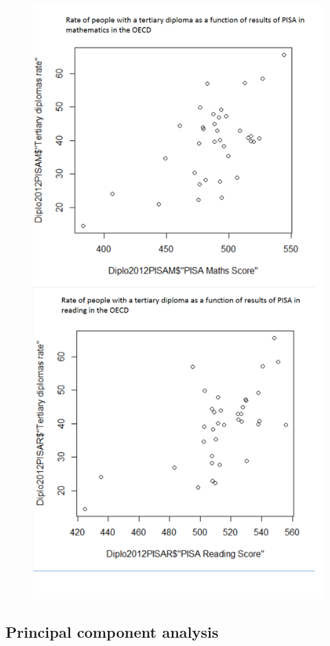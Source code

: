 \documentclass[12pt,a4paper]{article}
\begin{document}
\begin{figure}
	\includegraphics[scale=0.4]{img/3DRate.png}
\end{figure}

\subsection{Principal component analysis}
\end{document}
